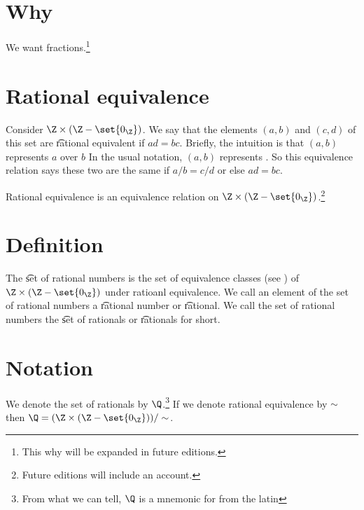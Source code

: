 

\section*{Why}

We want fractions.\footnote{This why will be expanded in future editions.}

\section*{Rational equivalence}

Consider $\Z  \times (\Z  - \set{0_{\Z }})$.
We say that the elements $(a, b)$ and $(c, d)$ of this set are \t{rational equivalent} if $ad = bc$.
Brieﬂy, the intuition is that $(a, b)$ represents $a$ over $b$
In the usual notation, $(a, b)$ represents .
So this equivalence relation says these two are the same if $a/b = c/d$ or else $ad= bc$.

\begin{proposition}
Rational equivalence is an equivalence relation on $\Z \times (\Z  - \set{0_{\Z }})$.\footnote{Future editions will include an account.}
\end{proposition}
\section*{Definition}

The \t{set of rational numbers} is the set of equivalence classes (see ) of $\Z  \times (\Z  - \set{0_{\Z }})$ under ratioanl equivalence.
We call an element of the set of rational numbers a \t{rational number} or \t{rational}.
We call the set of rational numbers the \t{set of rationals} or \t{rationals} for short.

\section*{Notation}

We denote the set of rationals by $\Q $.\footnote{From what we can tell, $\Q $ is a mnemonic for from the latin }
If we denote rational equivalence by $\sim$ then $\Q  = (\Z \times (\Z  - \set{0_{\Z }}))/\sim$.

\blankpage